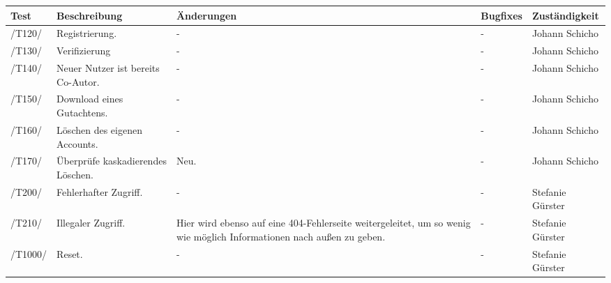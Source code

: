 \begin{table}[H]
	\centering
	\begin{tabular}{m{1.2cm}|m{3cm}|m{3.5cm}|m{3.5cm}|l}
		\toprule
		\textbf{Test} & \textbf{Beschreibung} & \textbf{Änderungen} & \textbf{Bugfixes} & \textbf{Zuständigkeit} \\\midrule
		/T120/ & Registrierung. & - & - & Johann Schicho \\\midrule
		/T130/ & Verifizierung & - & - & Johann Schicho \\\midrule
		/T140/ & Neuer Nutzer ist bereits Co-Autor. & - & - & Johann Schicho \\\midrule
		/T150/ & Download eines Gutachtens. & - & - & Johann Schicho \\\midrule
		/T160/ & Löschen des eigenen Accounts. & - & - & Johann Schicho \\\midrule
		/T170/ & Überprüfe kaskadierendes Löschen. & Neu. & - & Johann Schicho \\\midrule
		/T200/ & Fehlerhafter Zugriff. & - & - & Stefanie Gürster \\\midrule
		/T210/ & Illegaler Zugriff. & Hier wird ebenso auf eine 404-Fehlerseite weitergeleitet, um so wenig wie möglich Informationen nach außen zu geben. & - & Stefanie Gürster \\\midrule
		/T1000/ & Reset. & - & - & Stefanie Gürster
	\end{tabular}
\end{table}
